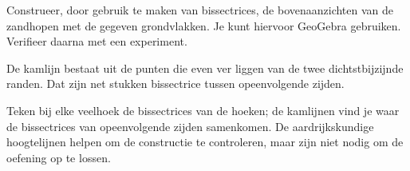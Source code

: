 \documentclass{ximera}
\begin{document}
\author{Alexander Holvoet}

\begin{exercise}
    Construeer, door gebruik te maken van bissectrices, de bovenaanzichten van de zandhopen
    met de gegeven grondvlakken. Je kunt hiervoor GeoGebra gebruiken. Verifieer daarna met
    een experiment.
    \begin{hint}
        De kamlijn bestaat uit de punten die even ver liggen van de twee dichtstbijzijnde
        randen. Dat zijn net stukken bissectrice tussen opeenvolgende zijden.
    \end{hint}
    \begin{oplossing}
        Teken bij elke veelhoek de bissectrices van de hoeken; de kamlijnen vind je waar de
        bissectrices van opeenvolgende zijden samenkomen. De aardrijkskundige hoogtelijnen
        helpen om de constructie te controleren, maar zijn niet nodig om de oefening op te
        lossen.
    \end{oplossing}
\end{exercise}

\end{document}
